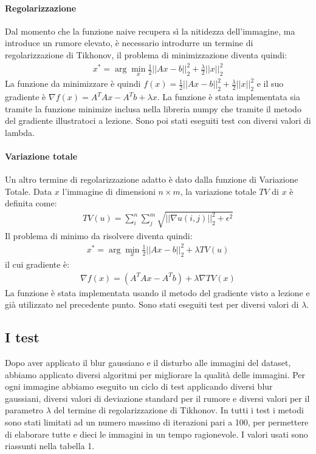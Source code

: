 \documentclass[12pt]{article}
\begin{document}
    \paragraph{Regolarizzazione}
    Dal momento che la funzione naive recupera sì la nitidezza dell'immagine, ma introduce un rumore elevato, è necessario introdurre un termine di regolarizzazione di Tikhonov, il problema di minimizzazione diventa quindi:
    \begin{align*}
        x^* = \arg\min_x \frac{1}{2} ||Ax - b||_2^2 + \frac{\lambda}{2} ||x||_2^2
    \end{align*}
    La funzione da minimizzare è quindi $f(x) = \frac{1}{2} ||Ax - b||_2^2 + \frac{\lambda}{2} ||x||_2^2$ e il suo gradiente è $\nabla f(x) = A^TAx - A^Tb + \lambda x$.
    La funzione è stata implementata sia tramite la funzione minimize inclusa nella libreria numpy che tramite il metodo del gradiente illustratoci a lezione. Sono poi stati eseguiti test con diversi valori di lambda.

    \paragraph{Variazione totale}
    Un altro termine di regolarizzazione adatto è dato dalla funzione di Variazione Totale. Data $x$ l'immagine di dimensioni $n\times m$, la variazione totale $TV$ di $x$ è definita come:
    \begin{align*}
        TV(u) = \sum_i^n{\sum_j^m{\sqrt{||\nabla u(i, j)||_2^2 + \epsilon^2}}}
    \end{align*}
    Il problema di minimo da risolvere diventa quindi:
    \begin{align*}
        x^* = \arg\min_x \frac{1}{2} ||Ax - b||_2^2 + \lambda TV(u)
    \end{align*}
    il cui gradiente è:
    \begin{align*}
    \nabla f(x) = (A^TAx - A^Tb)  + \lambda \nabla TV(x)
    \end{align*}
    La funzione è stata implementata usando il metodo del gradiente visto a lezione e già utilizzato nel precedente punto. Sono stati eseguiti test per diversi valori di $\lambda$.

    \subsection{I test}
    Dopo aver applicato il blur gaussiano e il disturbo alle immagini del dataset, abbiamo applicato diversi algoritmi per migliorare la qualità delle immagini. Per ogni immagine abbiamo eseguito un ciclo di test applicando diversi blur gaussiani, diversi valori di deviazione standard per il rumore e diversi valori per il parametro $\lambda$ del termine di regolarizzazione di Tikhonov. In tutti i test i metodi sono stati limitati ad un numero massimo di iterazioni pari a 100, per permettere di elaborare tutte e dieci le immagini in un tempo ragionevole. I valori usati sono riassunti nella tabella 1.
\end{document}
